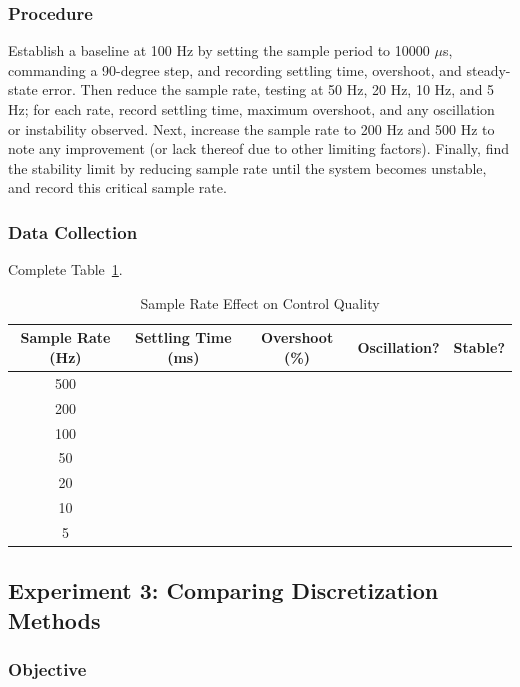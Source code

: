 \subsubsection{Procedure}

Establish a baseline at 100 Hz by setting the sample period to 10000 $\mu$s, commanding a 90-degree step, and recording settling time, overshoot, and steady-state error. Then reduce the sample rate, testing at 50 Hz, 20 Hz, 10 Hz, and 5 Hz; for each rate, record settling time, maximum overshoot, and any oscillation or instability observed. Next, increase the sample rate to 200 Hz and 500 Hz to note any improvement (or lack thereof due to other limiting factors). Finally, find the stability limit by reducing sample rate until the system becomes unstable, and record this critical sample rate.

\subsubsection{Data Collection}

Complete Table~\ref{tab:sample_rate_experiment}.

\begin{table}[htbp]
\centering
\caption{Sample Rate Effect on Control Quality}
\label{tab:sample_rate_experiment}
\begin{tabular}{ccccc}
\toprule
\textbf{Sample Rate (Hz)} & \textbf{Settling Time (ms)} & \textbf{Overshoot (\%)} & \textbf{Oscillation?} & \textbf{Stable?} \\
\midrule
500 & & & & \\
200 & & & & \\
100 & & & & \\
50 & & & & \\
20 & & & & \\
10 & & & & \\
5 & & & & \\
\bottomrule
\end{tabular}
\end{table}

\subsection{Experiment 3: Comparing Discretization Methods}

\subsubsection{Objective}

